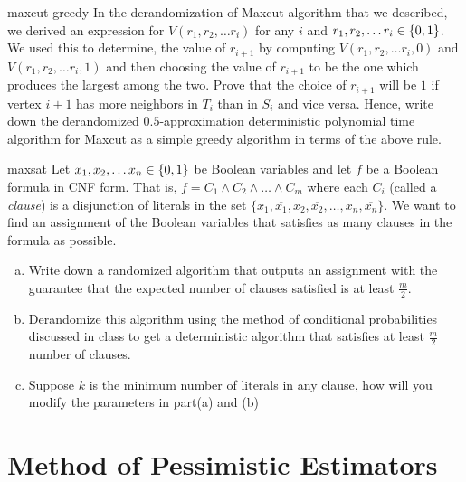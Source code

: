 \begin{exercise-prob}
\begin{show-ps1}{maxcut-greedy}
In the derandomization of {\sc Maxcut} algorithm that we described, we derived an expression for $V(r_1, r_2, \ldots r_i)$ for any $i$ and $r_1, r_2, \ldots r_i \in \{0,1\}$. We used this to determine, the value of $r_{i+1}$ by computing $V(r_1, r_2, \dots r_i, 0)$ and $V(r_1, r_2, \dots r_i, 1)$ and then choosing the value of $r_{i+1}$ to be the one which produces the largest among the two.
Prove that the choice of $r_{i+1}$ will be $1$ if vertex $i+1$ has more neighbors in $T_i$ than in $S_i$ and vice versa. Hence, write down the derandomized $0.5$-approximation deterministic polynomial time algorithm for {\sc Maxcut} as a simple greedy algorithm in terms of the above rule.
\end{show-ps1}
\end{exercise-prob}


\begin{exercise-prob}
\begin{show-ps1}{maxsat}
Let $x_1, x_2, \ldots x_n \in \{0,1\}$ be Boolean variables and let $f$ be a Boolean formula in CNF form. That is, $f = C_1 \land C_2 \land \ldots \land C_m$ where each $C_i$ (called a {\em clause}) is a disjunction of literals in the set $\{x_1, \overline{x_1}, x_2, \overline{x_2}, \ldots, x_n, \overline{x_n} \}$. We want to find an assignment of the Boolean variables that satisfies as many clauses in the formula as possible.
\begin{enumerate}[(a)]
\item Write down a randomized algorithm that outputs an assignment with the guarantee that the expected number of clauses satisfied is at least $\frac{m}{2}$.
\item Derandomize this algorithm using the method of conditional probabilities discussed in class to get a deterministic algorithm that satisfies at least $\frac{m}{2}$ number of clauses.
\item Suppose $k$ is the minimum number of literals in any clause, how will you modify the parameters in part(a) and (b) 
\end{enumerate}
\end{show-ps1}
\end{exercise-prob}

\section{Method of Pessimistic Estimators}

